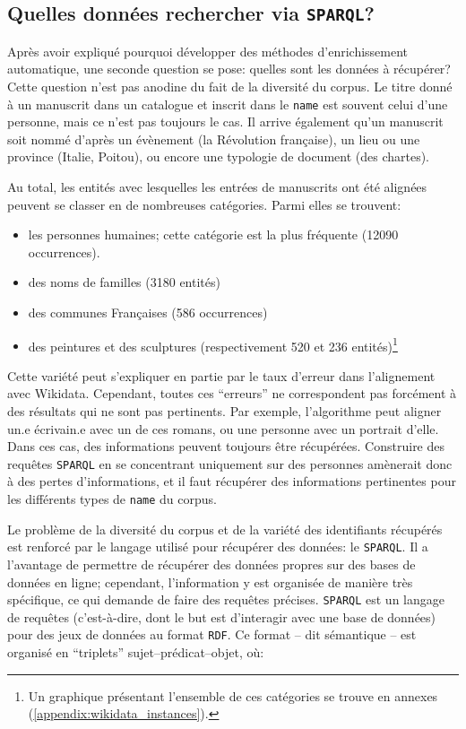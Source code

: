 \documentclass[a4paper, 12pt, twoside]{book}
\newcommand{\rdf}{\texttt{RDF}}
\newcommand{\sparql}{\texttt{SPARQL}}
\newcommand{\tname}{\texttt{name}}
\begin{document}
\subsection{Quelles données rechercher via \sparql?}
Après avoir expliqué pourquoi développer des méthodes d'enrichissement automatique, une seconde question se pose: quelles sont les données à récupérer? Cette question n'est pas anodine du fait de la diversité du corpus. Le titre donné à un manuscrit dans un catalogue et inscrit dans le \tname{} est souvent celui d'une personne, mais ce n'est pas toujours le cas. Il arrive également qu'un manuscrit soit nommé d'après un évènement (la Révolution française), un lieu ou une province (Italie, Poitou), ou encore une typologie de document (des chartes).

Au total, les entités avec lesquelles les entrées de manuscrits ont été alignées peuvent se classer en de nombreuses catégories. Parmi elles se trouvent:
\begin{itemize}
	\item les personnes humaines; cette catégorie est la plus fréquente (12090 occurrences).
	\item des noms de familles (3180 entités)
	\item des communes Françaises (586 occurrences)
	\item des peintures et des sculptures (respectivement 520 et 236 entités)\footnote{Un graphique présentant l'ensemble de ces catégories se trouve en annexes (\ref{appendix:wikidata_instances}).}
\end{itemize}

Cette variété peut s'expliquer en partie par le taux d'erreur dans l'alignement avec Wikidata. Cependant, toutes ces \enquote{erreurs} ne correspondent pas forcément à des résultats qui ne sont pas pertinents. Par exemple, l'algorithme peut aligner un.e écrivain.e avec un de ces romans, ou une personne avec un portrait d'elle. Dans ces cas, des informations peuvent toujours être récupérées. Construire des requêtes \sparql{} en se concentrant uniquement sur des personnes amènerait donc à des pertes d'informations, et il faut récupérer des informations pertinentes pour les différents types de \tname{} du corpus.

Le problème de la diversité du corpus et de la variété des identifiants récupérés est renforcé par le langage utilisé pour récupérer des données: le \sparql{}. Il a l'avantage de permettre de récupérer des données propres sur des bases de données en ligne; cependant, l'information y est organisée de manière très spécifique, ce qui demande de faire des requêtes précises. \sparql{} est un langage de requêtes (c'est-à-dire, dont le but est d'interagir avec une base de données) pour des jeux de données au format \rdf{}. Ce format -- dit sémantique -- est organisé en \enquote{triplets} sujet--prédicat--objet, où:
\end{document}

